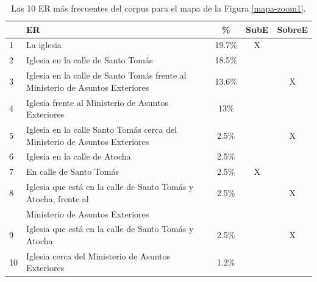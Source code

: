 \begin{table}[H]
{\footnotesize
\begin{center}
\begin{tabular}{|l|l|c|c|c|}
\hline
&ER 					       &  \% & SubE & SobreE\\ \hline \hline
1&La iglesia 																																		 &19.7\%  & X & \\ \hline
2&Iglesia en la calle de Santo Tom\'as																									 &18.5\% 	&  & \\ \hline
3&Iglesia en la calle de Santo Tom\'as frente al Ministerio de Asuntos Exteriores        &13.6\% &  &X \\ \hline
4&Iglesia frente al Ministerio de Asuntos Exteriores 													 &13\% &  & \\ \hline
5&Iglesia en la calle Santo Tom\'as cerca del Ministerio de Asuntos Exteriores        &2.5\% &  &X \\ \hline
6&Iglesia en la calle de Atocha																									 &2.5\%  &  & \\ \hline
7&En calle de Santo Tom\'as 																													 &2.5\% 	& X & \\ \hline
8&Iglesia que est\'a en la calle de Santo Tom\'as y Atocha, frente al 									 &2.5\%	&  &X \\ 
&Ministerio de Asuntos Exteriores																		 &&& \\ \hline
9&Iglesia que est\'a en la calle de Santo Tom\'as y Atocha										 &2.5\% 	&  &X \\ \hline
10&Iglesia cerca del Ministerio de Asuntos Exteriores														 &1.2\% 	&  & \\ \hline
\end{tabular}
\caption{Las 10 ER m\'as frecuentes del corpus para el mapa de la Figura \ref{mapa-zoom1}.}\label{freq-mapa}
\end{center}
}%
\end{table}

\vspace*{-0.5cm}


